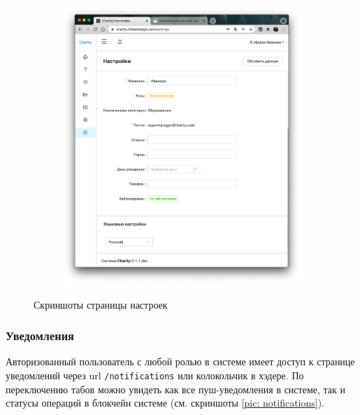 \documentclass[a4paper,12pt,reqno]{article}
\begin{document}
\begin{figure}[H]
\begin{subfigure}[b]{0.475\linewidth}
			\includegraphics[width=\linewidth]{img/ro/settings_lang.png}
		\end{subfigure}
		\caption{Скриншоты страницы настроек}
		\label{pic: settings}
	\end{figure}
	
	\subsubsection{Уведомления}
	
	Авторизованный пользователь с любой ролью в системе имеет доступ к странице  уведомлений через url \texttt{/notifications} или колокольчик в хэдере. По переключению табов можно увидеть как все пуш-уведомления в системе, так и статусы операций в блокчейн системе (см. скриншоты \ref{pic: notifications}).
	
\end{document}
